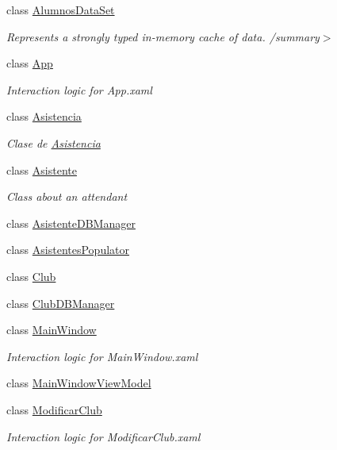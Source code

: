 \begin{DoxyCompactItemize}
\item 
class \hyperlink{class_asistencias__wpf_1_1_alumnos_data_set}{Alumnos\-Data\-Set}
\begin{DoxyCompactList}\small\item\em Represents a strongly typed in-\/memory cache of data. /summary$>$ \end{DoxyCompactList}\item 
class \hyperlink{class_asistencias__wpf_1_1_app}{App}
\begin{DoxyCompactList}\small\item\em Interaction logic for App.\-xaml \end{DoxyCompactList}\item 
class \hyperlink{class_asistencias__wpf_1_1_asistencia}{Asistencia}
\begin{DoxyCompactList}\small\item\em Clase de \hyperlink{class_asistencias__wpf_1_1_asistencia}{Asistencia} \end{DoxyCompactList}\item 
class \hyperlink{class_asistencias__wpf_1_1_asistente}{Asistente}
\begin{DoxyCompactList}\small\item\em Class about an attendant \end{DoxyCompactList}\item 
class \hyperlink{class_asistencias__wpf_1_1_asistente_d_b_manager}{Asistente\-D\-B\-Manager}
\item 
class \hyperlink{class_asistencias__wpf_1_1_asistentes_populator}{Asistentes\-Populator}
\item 
class \hyperlink{class_asistencias__wpf_1_1_club}{Club}
\item 
class \hyperlink{class_asistencias__wpf_1_1_club_d_b_manager}{Club\-D\-B\-Manager}
\item 
class \hyperlink{class_asistencias__wpf_1_1_main_window}{Main\-Window}
\begin{DoxyCompactList}\small\item\em Interaction logic for Main\-Window.\-xaml \end{DoxyCompactList}\item 
class \hyperlink{class_asistencias__wpf_1_1_main_window_view_model}{Main\-Window\-View\-Model}
\item 
class \hyperlink{class_asistencias__wpf_1_1_modificar_club}{Modificar\-Club}
\begin{DoxyCompactList}\small\item\em Interaction logic for Modificar\-Club.\-xaml \end{DoxyCompactList}\item 

\end{DoxyCompactItemize}
